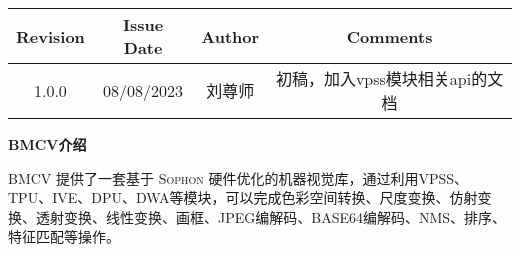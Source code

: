 \begin{center}
    \begin{table}[htb]
    \begin{adjustbox}{width=1\textwidth}
    \begin{tabular}{|>{\normalsize}c|>{\normalsize}c|>{\normalsize}c|>{\normalsize}c|}
    \hline
    \rowcolor[HTML]{C0C0C0}
    \textbf{Revision} & \textbf{Issue Date} & \textbf{Author} & \textbf{Comments}  \\ \hline
    1.0.0             & 08/08/2023          & 刘尊师             & 初稿，加入vpss模块相关api的文档 \\ \hline
    \end{tabular}
    \end{adjustbox}
    \end{table}
\end{center}
\newpage
\thispagestyle{normal}
\begin{center}
    \Large \textbf{BMCV介绍}
    \vspace*{0.5cm}
\end{center}

\begin{flushleft}
    \normalsize \textsc{BMCV 提供了一套基于 Sophon 硬件优化的机器视觉库，通过利用VPSS、TPU、IVE、DPU、DWA等模块，可以完成色彩空间转换、尺度变换、仿射变换、透射变换、线性变换、画框、JPEG编解码、BASE64编解码、NMS、排序、特征匹配等操作。}\tabularnewline
\end{flushleft}

\newpage
